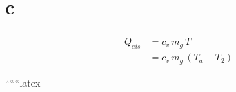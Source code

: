 

\section*{c}
\begin{align*}
    \dot{Q}_{eis} &= c_v \, m_{g} \, \dot{T} \\
    &= c_v \, m_{g} \, (T_a - T_2)
\end{align*}

``````latex
